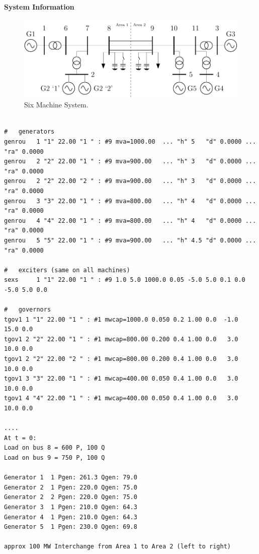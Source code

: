 \documentclass[12pt]{article}
\begin{document}
\paragraph{System Information}
\newcommand{\figW}{1}
	\begin{figure}[h!]
			\centering
			\includegraphics[width=\figW\linewidth]{../../models/sixMachine/sixMachine.pdf}\vspace{-.5em}
			\caption{Six Machine System.}
			\label{system}		 
	\end{figure}%
\begin{Verbatim}

#   generators
genrou   1 "1" 22.00 "1 " : #9 mva=1000.00  ... "h" 5   "d" 0.0000 ... "ra" 0.0000 
genrou   2 "2" 22.00 "1 " : #9 mva=900.00   ... "h" 3   "d" 0.0000 ... "ra" 0.0000 
genrou   2 "2" 22.00 "2 " : #9 mva=900.00   ... "h" 3   "d" 0.0000 ... "ra" 0.0000  
genrou   3 "3" 22.00 "1 " : #9 mva=800.00   ... "h" 4   "d" 0.0000 ... "ra" 0.0000
genrou   4 "4" 22.00 "1 " : #9 mva=800.00   ... "h" 4   "d" 0.0000 ... "ra" 0.0000  
genrou   5 "5" 22.00 "1 " : #9 mva=900.00   ... "h" 4.5 "d" 0.0000 ... "ra" 0.0000  

#   exciters (same on all machines)
sexs     1 "1" 22.00 "1 " : #9 1.0 5.0 1000.0 0.05 -5.0 5.0 0.1 0.0 -5.0 5.0 0.0

#   governors
tgov1 1 "1" 22.00 "1 " : #1 mwcap=1000.0 0.050 0.2 1.00 0.0  -1.0  15.0 0.0
tgov1 2 "2" 22.00 "1 " : #1 mwcap=800.00 0.200 0.4 1.00 0.0   3.0  10.0 0.0
tgov1 2 "2" 22.00 "2 " : #1 mwcap=800.00 0.200 0.4 1.00 0.0   3.0  10.0 0.0
tgov1 3 "3" 22.00 "1 " : #1 mwcap=400.00 0.050 0.4 1.00 0.0   3.0  10.0 0.0
tgov1 4 "4" 22.00 "1 " : #1 mwcap=400.00 0.050 0.4 1.00 0.0   3.0  10.0 0.0

....
At t = 0:
Load on bus 8 = 600 P, 100 Q
Load on bus 9 = 750 P, 100 Q

Generator 1  1 Pgen: 261.3 Qgen: 79.0
Generator 2  1 Pgen: 220.0 Qgen: 75.0
Generator 2  2 Pgen: 220.0 Qgen: 75.0
Generator 3  1 Pgen: 210.0 Qgen: 64.3
Generator 4  1 Pgen: 210.0 Qgen: 64.3
Generator 5  1 Pgen: 230.0 Qgen: 69.8

approx 100 MW Interchange from Area 1 to Area 2 (left to right)
\end{Verbatim}
\end{document}
